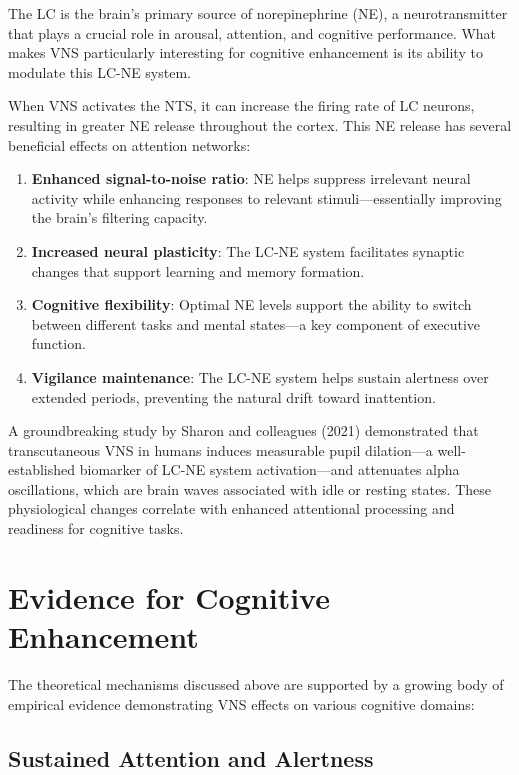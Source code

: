 \documentclass[
  Letterpaper,
]{scrbook}
\begin{document}
The LC is the brain's primary source of norepinephrine (NE), a
neurotransmitter that plays a crucial role in arousal, attention, and
cognitive performance. What makes VNS particularly interesting for
cognitive enhancement is its ability to modulate this LC-NE system.

When VNS activates the NTS, it can increase the firing rate of LC
neurons, resulting in greater NE release throughout the cortex. This NE
release has several beneficial effects on attention networks:

\begin{enumerate}
\def\labelenumi{\arabic{enumi}.}
\item
  \textbf{Enhanced signal-to-noise ratio}: NE helps suppress irrelevant
  neural activity while enhancing responses to relevant
  stimuli---essentially improving the brain's filtering capacity.
\item
  \textbf{Increased neural plasticity}: The LC-NE system facilitates
  synaptic changes that support learning and memory formation.
\item
  \textbf{Cognitive flexibility}: Optimal NE levels support the ability
  to switch between different tasks and mental states---a key component
  of executive function.
\item
  \textbf{Vigilance maintenance}: The LC-NE system helps sustain
  alertness over extended periods, preventing the natural drift toward
  inattention.
\end{enumerate}

A groundbreaking study by Sharon and colleagues (2021) demonstrated that
transcutaneous VNS in humans induces measurable pupil dilation---a
well-established biomarker of LC-NE system activation---and attenuates
alpha oscillations, which are brain waves associated with idle or
resting states. These physiological changes correlate with enhanced
attentional processing and readiness for cognitive tasks.

\section{Evidence for Cognitive
Enhancement}\label{evidence-for-cognitive-enhancement}

The theoretical mechanisms discussed above are supported by a growing
body of empirical evidence demonstrating VNS effects on various
cognitive domains:

\subsection{Sustained Attention and
Alertness}\label{sustained-attention-and-alertness}
\end{document}
